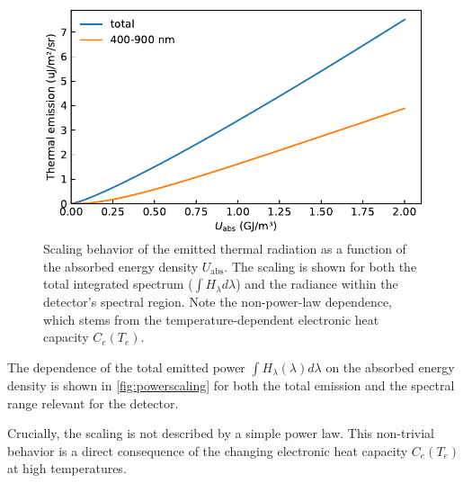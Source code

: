 \documentclass[
	a4paper,
]{scrarticle}
\begin{document}
\begin{figure}
    \centering
    \includegraphics{../analysis/figures/powerscaling.pdf}
    \caption{Scaling behavior of the emitted thermal radiation as a function of the absorbed energy density $U_{\text{abs}}$. The scaling is shown for both the total integrated spectrum ($\int H_\lambda d\lambda$) and the radiance within the detector's spectral region. Note the non-power-law dependence, which stems from the temperature-dependent electronic heat capacity $C_e(T_e)$.}
    \label{fig:powerscaling}
\end{figure}
The dependence of the total emitted power $\int H_\lambda(\lambda) d\lambda$ on the absorbed energy density is shown in \autoref{fig:powerscaling} for both the total emission and the spectral range relevant for the detector.

Crucially, the scaling is not described by a simple power law. This non-trivial behavior is a direct consequence of the changing electronic heat capacity $C_e(T_e)$ at high temperatures.

\clearpage
\end{document}
